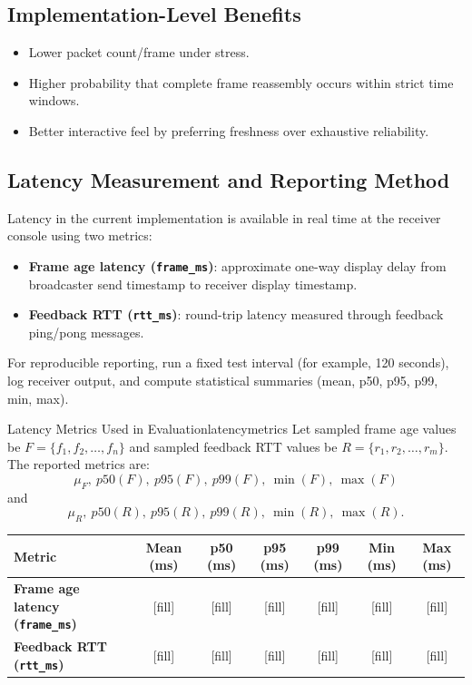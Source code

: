 \documentclass[12pt,a4paper]{article}
\begin{document}
\subsection{Implementation-Level Benefits}
\begin{itemize}[leftmargin=*, itemsep=4pt]
  \item Lower packet count/frame under stress.
  \item Higher probability that complete frame reassembly occurs within strict time windows.
  \item Better interactive feel by preferring freshness over exhaustive reliability.
\end{itemize}

\subsection{Latency Measurement and Reporting Method}
Latency in the current implementation is available in real time at the receiver console using two metrics:
\begin{itemize}[leftmargin=*, itemsep=4pt]
  \item \textbf{Frame age latency (\texttt{frame\_ms})}: approximate one-way display delay from broadcaster send timestamp to receiver display timestamp.
  \item \textbf{Feedback RTT (\texttt{rtt\_ms})}: round-trip latency measured through feedback ping/pong messages.
\end{itemize}

For reproducible reporting, run a fixed test interval (for example, 120 seconds), log receiver output, and compute statistical summaries (mean, p50, p95, p99, min, max).

\begin{definition}{Latency Metrics Used in Evaluation}{latencymetrics}
Let sampled frame age values be \(F = \{f_1, f_2, \dots, f_n\}\) and sampled feedback RTT values be \(R = \{r_1, r_2, \dots, r_m\}\). The reported metrics are:
\[
\mu_F,\ p50(F),\ p95(F),\ p99(F),\ \min(F),\ \max(F)
\]
and
\[
\mu_R,\ p50(R),\ p95(R),\ p99(R),\ \min(R),\ \max(R).
\]
\end{definition}

\begin{center}
\renewcommand{\arraystretch}{1.35}
\begin{tabular}{>{\bfseries}l|c|c|c|c|c|c}
\toprule
Metric & Mean (ms) & p50 (ms) & p95 (ms) & p99 (ms) & Min (ms) & Max (ms) \\
\midrule
Frame age latency (\texttt{frame\_ms}) & [fill] & [fill] & [fill] & [fill] & [fill] & [fill] \\
Feedback RTT (\texttt{rtt\_ms}) & [fill] & [fill] & [fill] & [fill] & [fill] & [fill] \\
\bottomrule
\end{tabular}
\end{center}
\end{document}
